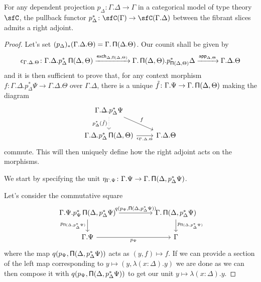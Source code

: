 \begin{lem}\label{radj}
  For any dependent projection $p_\Delta\colon\Gamma.\Delta\rightarrow\Gamma$ in
  a categorical model of type theory $\sfC$, the pullback functor
  $p_\Delta^*\colon\sfC(\Gamma)\rightarrow\sfC(\Gamma.\Delta)$ between the fibrant
  slices admits a right adjoint.
\end{lem}
\begin{proof}

  Let's set $(p_\Delta)_*(\Gamma.\Delta.\Theta)=\Gamma.\operatorname{\mathsf{\Pi}}(\Delta.\Theta)$. Our
  counit shall be given by
  \[\epsilon_{\Gamma.\Delta.\Theta}\colon\Gamma.\Delta.p^*_\Delta\operatorname{\mathsf{\Pi}}(\Delta,\Theta)
  \xrightarrow{\operatorname{\mathsf{exch}}_{\Delta,\operatorname{\mathsf{\Pi}}(\Delta,\Theta)}}\Gamma.\operatorname{\mathsf{\Pi}}(\Delta,\Theta).p^*_{\operatorname{\mathsf{\Pi}}(\Delta,\Theta)}\Delta
  \xrightarrow{\operatorname{\mathsf{app}}_{\Delta,\Theta}}\Gamma.\Delta.\Theta\]
  and it is then sufficient to prove that, for any context morphism
  $f\colon\Gamma.\Delta.p^*_\Delta\Psi\rightarrow\Gamma.\Delta.\Theta$ over
  $\Gamma.\Delta$, there is
  a unique $\tilde{f}\colon\Gamma.\Psi\rightarrow\Gamma.\operatorname{\mathsf{\Pi}}(\Delta,\Theta)$
  making the diagram
  \[\begin{tikzcd}
    {\Gamma.\Delta.p^*_\Delta\Psi} \\
    {\Gamma.\Delta.p^*_\Delta\Pis(\Delta,\Theta)} & {\Gamma.\Delta.\Theta}
    \arrow["f", from=1-1, to=2-2]
    \arrow["{\epsilon_{\Gamma.\Delta.\Theta}}"', from=2-1, to=2-2]
    \arrow["{p^*_\Delta(\tilde{f})}"', dotted, from=1-1, to=2-1]
  \end{tikzcd}\]
  commute. This will then uniquely define how the right adjoint acts on the
  morphisms.

  We start by specifying the unit
  $\eta_{\Gamma.\Psi}\colon\Gamma.\Psi\rightarrow\Gamma.\operatorname{\mathsf{\Pi}}(\Delta,p^*_{\Delta}\Psi)$.

  Let's consider the commutative square
  \[\begin{tikzcd}[column sep=huge]
    {\Gamma.\Psi.p^*_\Psi\Pis(\Delta,p^*_\Delta\Psi)} & {\Gamma.\Pis(\Delta,p^*_\Delta\Psi)} \\
    {\Gamma.\Psi} & \Gamma
    \arrow["{p_{\Pis(\Delta,p^*_\Delta\Psi)}}"', from=1-1, to=2-1]
    \arrow["{p_{\Psi}}"', from=2-1, to=2-2]
    \arrow["{p_{\Pis(\Delta,p^*_\Delta\Psi)}}", from=1-2, to=2-2]
    \arrow["{q(p_\Psi,\Pis(\Delta,p^*_\Delta\Psi))}", from=1-1, to=1-2]
  \end{tikzcd}\]
  where the map $q(p_\Psi,\operatorname{\mathsf{\Pi}}(\Delta,p^*_\Delta\Psi))$ acts as $(y,f)\mapsto
  f$. If we can provide a section of the left map
  corresponding to $y\mapsto(y,\lambda(x:\Delta).y)$ we are
  done as we can then compose
  it with $q(p_\Psi,\operatorname{\mathsf{\Pi}}(\Delta,p^*_\Delta\Psi))$ to get our unit
  $y\mapsto\lambda(x:\Delta).y$.
  

\end{proof}

